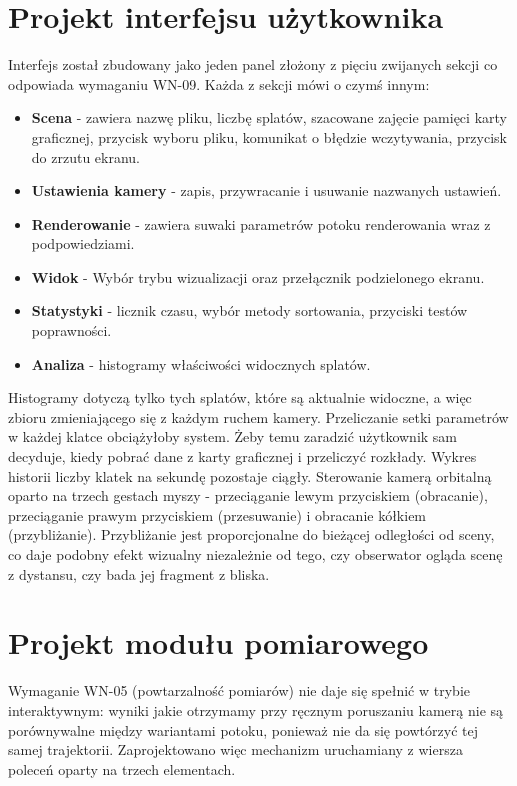 \section{Projekt interfejsu użytkownika}
\label{sec:gui}
Interfejs został zbudowany jako jeden panel złożony z pięciu zwijanych sekcji co odpowiada wymaganiu WN-09. Każda z sekcji mówi o czymś innym:
\begin{itemize}
    \item \textbf{Scena} - zawiera nazwę pliku, liczbę splatów, szacowane zajęcie pamięci karty graficznej, przycisk wyboru pliku, komunikat o błędzie wczytywania, przycisk do zrzutu ekranu.
    \item \textbf{Ustawienia kamery} - zapis, przywracanie i usuwanie nazwanych ustawień.
    \item \textbf{Renderowanie} - zawiera suwaki parametrów potoku renderowania wraz z podpowiedziami.
    \item \textbf{Widok} - Wybór trybu wizualizacji oraz przełącznik podzielonego ekranu.
    \item \textbf{Statystyki} - licznik czasu, wybór metody sortowania, przyciski testów poprawności.
    \item \textbf{Analiza} - histogramy właściwości widocznych splatów.
\end{itemize}
Histogramy dotyczą tylko tych splatów, które są aktualnie widoczne, a więc zbioru zmieniającego się z każdym ruchem kamery. Przeliczanie setki parametrów w każdej klatce obciążyłoby system. Żeby temu zaradzić użytkownik sam decyduje, kiedy pobrać dane z karty graficznej i przeliczyć rozkłady. Wykres historii liczby klatek na sekundę pozostaje ciągły.
Sterowanie kamerą orbitalną oparto na trzech gestach myszy - przeciąganie lewym przyciskiem (obracanie), przeciąganie prawym przyciskiem (przesuwanie) i obracanie kółkiem (przybliżanie). Przybliżanie jest proporcjonalne do bieżącej odległości od sceny, co daje podobny efekt wizualny niezależnie od tego, czy obserwator ogląda scenę z dystansu, czy bada jej fragment z bliska.

\section{Projekt modułu pomiarowego}
\label{sec:measure}
Wymaganie WN-05 (powtarzalność pomiarów) nie daje się spełnić w trybie interaktywnym: wyniki jakie otrzymamy przy ręcznym poruszaniu kamerą nie są porównywalne między wariantami potoku, ponieważ nie da się powtórzyć tej samej trajektorii. Zaprojektowano więc mechanizm uruchamiany z wiersza poleceń oparty na trzech elementach. 

